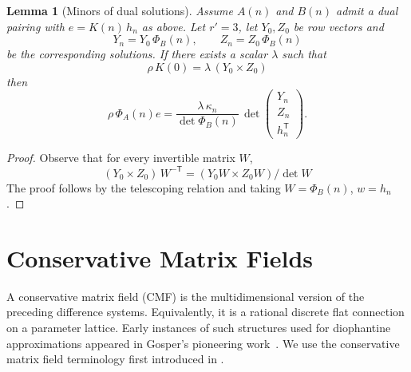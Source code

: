 \documentclass[oneside,english,11pt]{amsart}
\newtheorem{lemma}[thm]{Lemma}
\providecommand{\Z}{\mathbb Z}
\begin{document}
\begin{lemma}[Minors of dual solutions]\label{lem:minors}
Assume $A(n)$ and $B(n)$ admit a dual pairing with $e=K(n)\,h_n$ as above. Let $r'=3$, let $Y_0,Z_0$ be row vectors and
\[
Y_n=Y_0\,\Phi_B(n),\qquad Z_n=Z_0\,\Phi_B(n)
\]
be the corresponding solutions.
If there exists a scalar $\lambda$ such that
\[
\rho\,K(0)=\lambda\,(Y_0\times Z_0)\]
then
\[
  \rho\,\Phi_A(n)e=\frac{\lambda\,\kappa_n}{\det\Phi_B(n)}\,
  \det\begin{pmatrix}Y_n\\Z_n\\h_n^{\mathsf T}\end{pmatrix}.
\]
\end{lemma}
\begin{proof}
Observe that for every invertible matrix $W$,
\[
(Y_0\times Z_0)\,W^{-\mathsf T}=(Y_0W\times Z_0W)/\det W\]
The proof follows by the telescoping relation and taking $W=\Phi_B(n)$, $w=h_n$.
\end{proof}





\section{Conservative Matrix Fields}
\label{sec:cmfs}

A conservative matrix field (CMF) is the multidimensional version of the preceding difference systems. Equivalently, it is a rational discrete flat connection on a parameter lattice. 
Early instances of such structures used for diophantine approximations appeared in Gosper's pioneering work~\cite{Gosper1990}.
We use the conservative matrix field terminology first introduced in \cite{
elimelech2024algorithm}.
%
%

\end{document}
